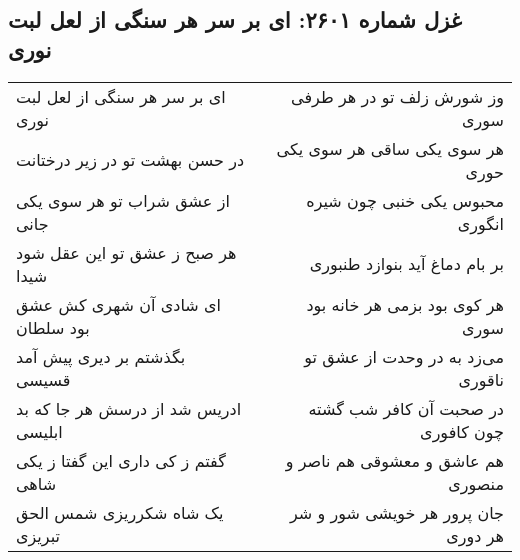 \begin{center}
\section*{غزل شماره ۲۶۰۱: ای بر سر هر سنگی از لعل لبت نوری}
\label{sec:2601}
\begin{longtable}{l p{0.5cm} r}
ای بر سر هر سنگی از لعل لبت نوری
&&
وز شورش زلف تو در هر طرفی سوری
\\
در حسن بهشت تو در زیر درختانت
&&
هر سوی یکی ساقی هر سوی یکی حوری
\\
از عشق شراب تو هر سوی یکی جانی
&&
محبوس یکی خنبی چون شیره انگوری
\\
هر صبح ز عشق تو این عقل شود شیدا
&&
بر بام دماغ آید بنوازد طنبوری
\\
ای شادی آن شهری کش عشق بود سلطان
&&
هر کوی بود بزمی هر خانه بود سوری
\\
بگذشتم بر دیری پیش آمد قسیسی
&&
می‌زد به در وحدت از عشق تو ناقوری
\\
ادریس شد از درسش هر جا که بد ابلیسی
&&
در صحبت آن کافر شب گشته چون کافوری
\\
گفتم ز کی داری این گفتا ز یکی شاهی
&&
هم عاشق و معشوقی هم ناصر و منصوری
\\
یک شاه شکرریزی شمس الحق تبریزی
&&
جان پرور هر خویشی شور و شر هر دوری
\\
\end{longtable}
\end{center}
